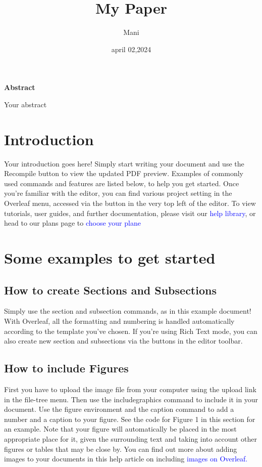 \documentclass{article}
\title{My Paper}
\author{Mani}
\date{april 02,2024}
\begin{document}
	\maketitle
	\begin{center}
		\textbf{Abstract}
	\end{center}
	Your abstract
	\section{Introduction}
	Your introduction goes here! Simply start writing your document and use the Recompile button to
	view the updated PDF preview. Examples of commonly used commands and features are listed below,
	to help you get started.
	Once you’re familiar with the editor, you can find various project setting in the Overleaf menu,
	accessed via the button in the very top left of the editor. To view tutorials, user guides, and further
	documentation, please visit our \textcolor{blue}{help library}, or head to our plans page to \textcolor{blue}{choose your plane}
	\section{Some examples to get started}
	\subsection{How to create Sections and Subsections}
	Simply use the section and subsection commands, as in this example document! With Overleaf, all
	the formatting and numbering is handled automatically according to the template you’ve chosen. If
	you’re using Rich Text mode, you can also create new section and subsections via the buttons in the
	editor toolbar.
	\subsection{How to include Figures}
	First you have to upload the image file from your computer using the upload link in the file-tree menu.
	Then use the includegraphics command to include it in your document. Use the figure environment
	and the caption command to add a number and a caption to your figure. See the code for Figure 1 in
	this section for an example.
	Note that your figure will automatically be placed in the most appropriate place for it, given the
	surrounding text and taking into account other figures or tables that may be close by. You can find
	out more about adding images to your documents in this help article on including \textcolor{blue}{images on Overleaf.}
	
\end{document}
